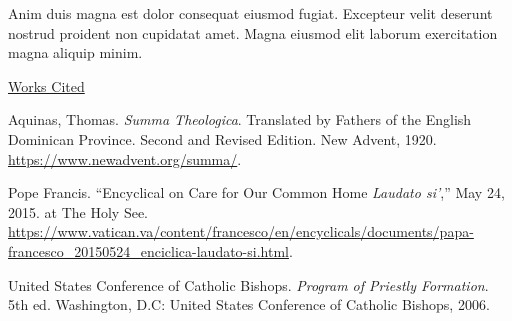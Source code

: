 \documentclass[
    12pt,
    letterpaper,
    oneside,
    noraggedright
]{turabian-researchpaper}
\newlength{\cslhangindent}
\newenvironment{CSLReferences}[2]
 {
\newpage %
\centerline{\underline{Works Cited}} %
 \setlength{\parindent}{0pt}
 \singlespacing
  \let\oldpar\par
  \def\par{\hangindent=\cslhangindent\oldpar}
  \setlength{\parskip}{1em}
 }
{
}
\begin{document}
Anim duis magna est dolor consequat eiusmod fugiat. Excepteur velit
deserunt nostrud proident non cupidatat amet. Magna eiusmod elit laborum
exercitation magna aliquip minim.

\hypertarget{refs}{}
\begin{CSLReferences}{1}{0}
\leavevmode{}%
Aquinas, Thomas. \emph{Summa Theologica}. Translated by Fathers of the
English Dominican Province. Second and Revised Edition. New Advent,
1920. \url{https://www.newadvent.org/summa/}.

\leavevmode{}%
Pope Francis. {``Encyclical on Care for Our Common Home \emph{Laudato
si'},''} May 24, 2015. at The Holy See.
\url{https://www.vatican.va/content/francesco/en/encyclicals/documents/papa-francesco_20150524_enciclica-laudato-si.html}.

\leavevmode{}%
United States Conference of Catholic Bishops. \emph{Program of Priestly
Formation}. 5th ed. Washington, D.C: United States Conference of
Catholic Bishops, 2006.

\end{CSLReferences}
\end{document}
